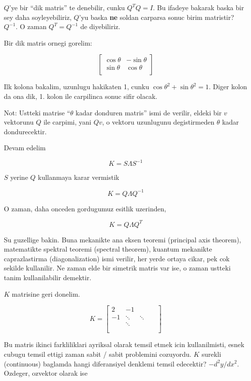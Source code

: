 \documentclass[12pt,fleqn]{article}\usepackage{../common}
\begin{document}
$Q$'ye bir ``dik matris'' te denebilir, cunku $Q^TQ = I$. Bu ifadeye
bakarak baska bir sey daha soyleyebiliriz, $Q$'yu baska \textbf{ne} soldan
carparsa sonuc birim matristir? $Q^{-1}$. O zaman $Q^T = Q^{-1}$ de
diyebiliriz.

Bir dik matris ornegi gorelim:

\[ 
\left[\begin{array}{cc}
\cos \theta & -\sin \theta \\
\sin \theta & \cos \theta \\
\end{array}\right]
 \]

Ilk kolona bakalim, uzunlugu hakikaten 1, cunku $\cos \theta ^2 + \sin \theta
^2 = 1$. 
Diger kolon da ona dik, 1. kolon ile carpilinca sonuc sifir olacak. 

Not: Ustteki matrise ``$\theta$ kadar donduren matris'' ismi de verilir,
eldeki bir $v$ vektorunu $Q$ ile carpimi, yani $Qv$, o vektoru uzunlugunu
degistirmeden $\theta$ kadar dondurecektir.

Devam edelim

\[ K = S \Lambda S^{-1} \]

$S$ yerine $Q$ kullanmaya karar vermistik

\[  K = Q \Lambda Q^{-1} \]

O zaman, daha onceden gordugumuz esitlik uzerinden, 

\[  K = Q \Lambda Q^{T} \]

Su guzellige bakin. Buna mekanikte ana eksen teoremi (principal axis
theorem), matematikte spektral teoremi (spectral theorem), kuantum
mekanikte caprazlastirma (diagonalization) ismi verilir, her yerde ortaya
cikar, pek cok sekilde kullanilir. Ne zaman elde bir simetrik matris var
ise, o zaman ustteki tanim kullanilabilir demektir.

$K$ matrisine geri donelim. 

\[ 
K =
\left[\begin{array}{rrrrr}
2 & -1 &&& \\
-1 & \ddots & \ddots && \\
& \ddots &&& \\
&&&& \\
&&&& 
\end{array}\right]
 \]

Bu matris ikinci farkliliklari ayriksal olarak temsil etmek icin
kullanilmisti, esnek cubugu temsil ettigi zaman sabit / sabit problemini
cozuyordu. $K$ surekli (continuous) baglamda hangi diferansiyel
denklemi temsil edecektir? $-d^2y/dx^2$.  Ozdeger, ozvektor olarak ise
\end{document}

